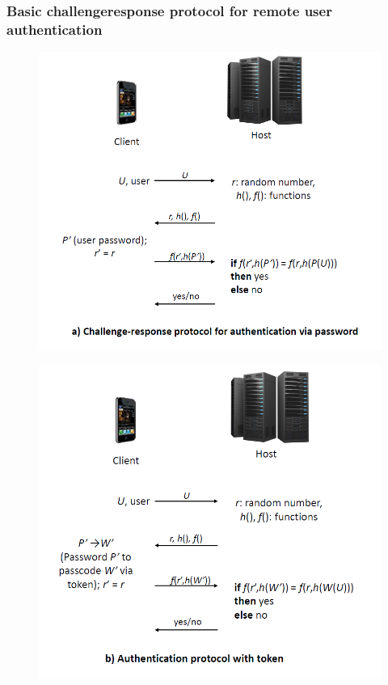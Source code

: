 \documentclass{article}
\begin{document}
            \subsubsection{Basic challengeresponse
                protocol for
                remote user
                authentication}
                \begin{figure}[h]
                    \begin{center}
                        \includegraphics[scale=0.5]{../immagini/network_protocol1.png}
                    \end{center}
                \end{figure}
                \begin{figure}[h]
                    \begin{center}
                        \includegraphics[scale=0.5]{../immagini/network_protocol2.png}
                    \end{center}
                \end{figure}
\end{document}
